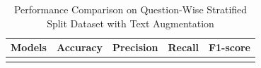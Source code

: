 \begin{longtable}{|p{.40\linewidth}|p{.11\linewidth}|p{.11\linewidth}|p{.11\linewidth}|p{.11\linewidth}|}
\caption{Performance Comparison on Question-Wise Stratified Split Dataset with Text Augmentation} \label{augmented_longtable} \\
\hline
\textbf{Models}&
\textbf{Accuracy} & \textbf{Precision} & \textbf{Recall} & \textbf{F1-score}\\
\hline
\endfirsthead %

\hline
\endhead %

\hline
\endfoot %

\hline
\endlastfoot %


\end{longtable}
